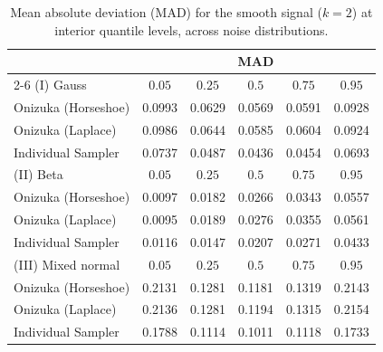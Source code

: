 \begin{table}[htbp]
\centering
\caption{Mean absolute deviation (MAD) for the smooth signal ($k=2$) at interior quantile levels, across noise distributions.}
\label{tab:s_int_mad}
\begin{tabular}{lccccc}
\toprule
& \multicolumn{5}{c}{MAD} \\
\cmidrule(lr){2-6}
(I) Gauss & $0.05$ & $0.25$ & $0.5$ & $0.75$ & $0.95$ \\
\midrule
Onizuka (Horseshoe) & 0.0993 & 0.0629 & 0.0569 & 0.0591 & 0.0928 \\
Onizuka (Laplace)   & 0.0986 & 0.0644 & 0.0585 & 0.0604 & 0.0924 \\
Individual Sampler  & 0.0737 & 0.0487 & 0.0436 & 0.0454 & 0.0693 \\
\midrule
(II) Beta & $0.05$ & $0.25$ & $0.5$ & $0.75$ & $0.95$ \\
\midrule
Onizuka (Horseshoe) & 0.0097 & 0.0182 & 0.0266 & 0.0343 & 0.0557 \\
Onizuka (Laplace)   & 0.0095 & 0.0189 & 0.0276 & 0.0355 & 0.0561 \\
Individual Sampler  & 0.0116 & 0.0147 & 0.0207 & 0.0271 & 0.0433 \\
\midrule
(III) Mixed normal & $0.05$ & $0.25$ & $0.5$ & $0.75$ & $0.95$ \\
\midrule
Onizuka (Horseshoe) & 0.2131 & 0.1281 & 0.1181 & 0.1319 & 0.2143 \\
Onizuka (Laplace)   & 0.2136 & 0.1281 & 0.1194 & 0.1315 & 0.2154 \\
Individual Sampler  & 0.1788 & 0.1114 & 0.1011 & 0.1118 & 0.1733 \\
\bottomrule
\end{tabular}
\end{table}

